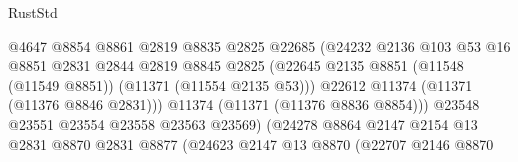 \begin{lexlean}{RustStd}
\begin{coremodule}
                                            @4647
                                            @8854
                                            @8861
                                            @2819
                                            @8835
                                            @2825
                                            @22685
                                            (@24232
                                              @2136
                                              @103
                                              @53
                                              @16
                                              @8851
                                              @2831
                                              @2844
                                              @2819
                                              @8845
                                              @2825
                                              (@22645
                                                @2135
                                                @8851
                                                (@11548 (@11549 @8851))
                                                (@11371 (@11554 @2135 @53)))
                                              @22612
                                              @11374
                                              (@11371 (@11376 @8846 @2831)))
                                            @11374
                                            (@11371 (@11376 @8836 @8854)))
                                          @23548
                                          @23551
                                          @23554
                                          @23558
                                          @23563
                                          @23569)
                                        (@24278
                                          @8864
                                          @2147
                                          @2154
                                          @13
                                          @2831
                                          @8870
                                          @2831
                                          @8877
                                          (@24623
                                            @2147
                                            @13
                                            @8870
                                            (@22707
                                              @2146
                                              @8870

\end{coremodule}
\end{lexlean}

